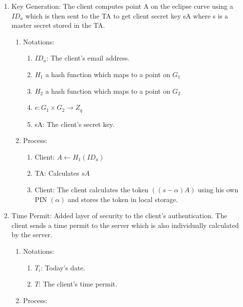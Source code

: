\documentclass[]{article}   %
\begin{document}
\begin{enumerate}
    \item Key Generation: The client computes point A on the eclipse curve using a $ID_a$ which is then sent to the TA to get client secret key sA where s is a master secret stored in the TA.
          \begin{enumerate}
              \item Notations:
                    \begin{enumerate}
                        \item $ID_a$: The client's email address.
                        \item $H_1$ a hash function which maps to a point on $G_1$
                        \item $H_2$ a hash function which maps to a point on $G_2$
                        \item $e: G_1 \times  G_2 \rightarrow Z_q$
                        \item sA: The client's secret key.
                    \end{enumerate}
              \item Process:
                    \begin{enumerate}
                        \item Client: $A \leftarrow H_1(ID_a) $
                        \item TA: Calculates $sA$
                        \item Client: The client calculates the token $((s-\alpha)A)$ using his own PIN $(\alpha)$ and stores the token in local storage.
                    \end{enumerate}
          \end{enumerate}
    \item Time Permit: Added layer of security to the client's authentication. The client sends a time permit to the server which is also individually calculated by the server.
          \begin{enumerate}
              \item Notations:
                    \begin{enumerate}
                        \item $T_i$: Today's date.
                        \item $T$: The client's time permit.
                    \end{enumerate}
              \item Process:
                    \begin{enumerate}

\end{enumerate}
\end{enumerate}
\end{enumerate}
\end{document}

